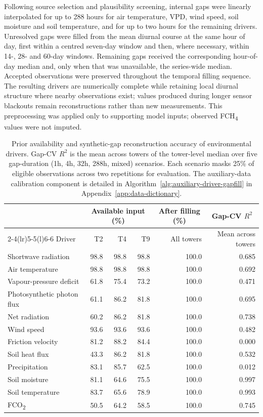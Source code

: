 Following source selection and plausibility screening, internal gaps were linearly interpolated for
up to 288 hours for air temperature, VPD, wind speed, soil moisture and soil temperature, and for up
to two hours for the remaining drivers. Unresolved gaps were filled from the mean diurnal course at
the same hour of day, first within a centred seven-day window and then, where necessary, within 14-,
28- and 60-day windows. Remaining gaps received the corresponding hour-of-day median and, only when
that was unavailable, the series-wide median. Accepted observations were preserved throughout the
temporal filling sequence. The resulting drivers are numerically complete while retaining local
diurnal structure where nearby observations exist; values produced during longer sensor blackouts
remain reconstructions rather than new measurements. This preprocessing was applied only to supporting 
model inputs; observed FCH\textsubscript{4} values were not imputed.

\begin{table}[htbp]
\centering
\small
\caption{
    Prior availability and synthetic-gap reconstruction accuracy of environmental drivers.
    Gap-CV $R^2$ is the mean across towers of the tower-level median over five gap-duration 
    (1h, 4h, 32h, 288h, mixed) scenarios. Each scenario masks 25\% of eligible observations 
    across two repetitions for evaluation. The auxiliary-data calibration component is detailed in
    Algorithm~\ref{alg:auxiliary-driver-gapfill} in Appendix~\ref{app:data-dictionary}.
}
\label{tab:ch3_environmental_gapfill}
\begin{tabular*}{\textwidth}{@{\extracolsep{\fill}}lrrrrr@{}}
\toprule
& \multicolumn{3}{c}{Available input (\%)} & \multicolumn{1}{c}{After filling (\%)}
& \multicolumn{1}{c}{Gap-CV $R^2$} \\
\cmidrule(lr){2-4}\cmidrule(lr){5-5}\cmidrule(l){6-6}
Driver & T2 & T4 & T9 & All towers & Mean across towers \\
\midrule
Shortwave radiation & 98.8 & 98.8 & 98.8 & 100.0 & 0.685 \\
Air temperature & 98.8 & 98.8 & 98.8 & 100.0 & 0.692 \\
Vapour-pressure deficit & 61.8 & 75.4 & 73.2 & 100.0 & 0.471 \\
Photosynthetic photon flux & 61.1 & 86.2 & 81.8 & 100.0 & 0.695 \\
Net radiation & 60.2 & 86.2 & 81.8 & 100.0 & 0.738 \\
Wind speed & 93.6 & 93.6 & 93.6 & 100.0 & 0.482 \\
Friction velocity & 81.2 & 88.2 & 84.4 & 100.0 & 0.000 \\
Soil heat flux & 43.3 & 86.2 & 81.8 & 100.0 & 0.532 \\
Precipitation & 83.1 & 85.7 & 62.5 & 100.0 & 0.012 \\
Soil moisture & 81.1 & 64.6 & 75.5 & 100.0 & 0.997 \\
Soil temperature & 83.7 & 65.6 & 78.9 & 100.0 & 0.993 \\
FCO\textsubscript{2} & 50.5 & 64.2 & 58.5 & 100.0 & 0.745 \\
\bottomrule
\end{tabular*}
\end{table}

